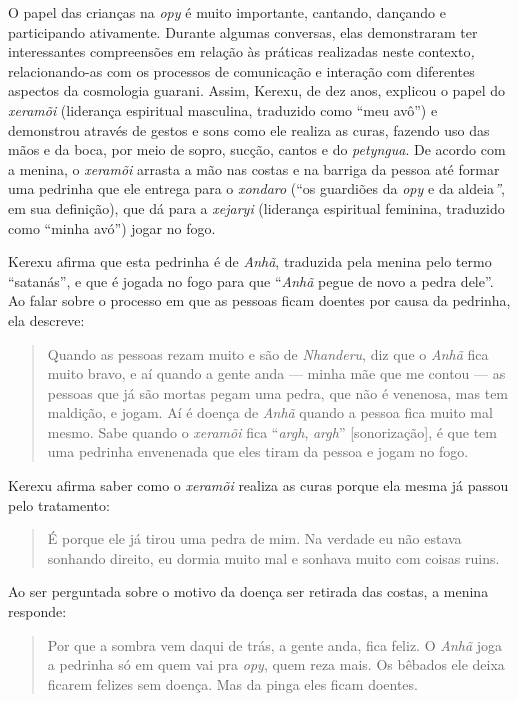 O papel das crianças na \emph{opy} é muito importante, cantando,
dançando e participando ativamente. Durante algumas conversas, elas
demonstraram ter interessantes compreensões em relação às práticas
realizadas neste contexto\emph{,} relacionando-as com os processos de
comunicação e interação com diferentes aspectos da cosmologia guarani.
Assim, Kerexu, de dez anos, explicou o papel do \emph{xeramõi}
(liderança espiritual masculina, traduzido como ``meu avô'') e
demonstrou através de gestos e sons como ele realiza as curas, fazendo
uso das mãos e da boca, por meio de sopro, sucção, cantos e do
\emph{petyngua}. De acordo com a menina, o \emph{xeramõi} arrasta a mão
nas costas e na barriga da pessoa até formar uma pedrinha que ele
entrega para o \emph{xondaro} (``os guardiões da \emph{opy} e da
aldeia\emph{''}, em sua definição), que dá para a \emph{xejaryi}
(liderança espiritual feminina, traduzido como ``minha avó'') jogar no
fogo.

Kerexu afirma que esta pedrinha é de \emph{Anhã}, traduzida pela menina
pelo termo ``satanás'', e que é jogada no fogo para que ``\emph{Anhã}
pegue de novo a pedra dele''. Ao falar sobre o processo em que as
pessoas ficam doentes por causa da pedrinha, ela descreve:

\begin{quote}
Quando as pessoas rezam muito e são de \emph{Nhanderu}, diz que o
\emph{Anhã} fica muito bravo, e aí quando a gente anda --- minha mãe que
me contou --- as pessoas que já são mortas pegam uma pedra, que não é
venenosa, mas tem maldição, e jogam. Aí é doença de \emph{Anhã} quando a
pessoa fica muito mal mesmo. Sabe quando o \emph{xeramõi} fica
``\emph{argh}, \emph{argh}'' {[}sonorização{]}, é que tem uma pedrinha
envenenada que eles tiram da pessoa e jogam no fogo.
\end{quote}

Kerexu afirma saber como o \emph{xeramõi} realiza as curas porque ela
mesma já passou pelo tratamento:

\begin{quote}
É porque ele já tirou uma pedra de mim. Na verdade eu não estava
sonhando direito, eu dormia muito mal e sonhava muito com coisas ruins.
\end{quote}

Ao ser perguntada sobre o motivo da doença ser retirada das costas, a
menina responde:

\begin{quote}
Por que a sombra vem daqui de trás, a gente anda, fica feliz. O
\emph{Anhã} joga a pedrinha só em quem vai pra \emph{opy}, quem reza
mais. Os bêbados ele deixa ficarem felizes sem doença. Mas da pinga eles
ficam doentes.
\end{quote}

